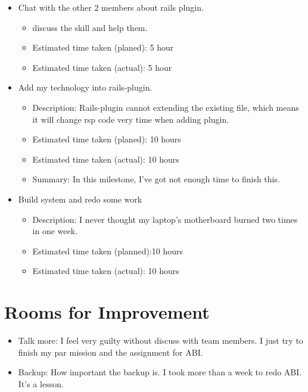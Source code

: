 \documentclass{article}
\begin{document}
\begin{itemize}
\begin{itemize}
\begin{itemize}
                \end{itemize}
        \end{itemize}
    \item Chat with the other 2 members about rails plugin.
        \begin{itemize}
            \item discuss the skill and help them. 
            \item Estimated time taken (planed): 5 hour
            \item Estimated time taken (actual): 5 hour
        \end{itemize}
    \item Add my technology into rails-plugin.
        \begin{itemize}
            \item Description: Rails-plugin cannot extending the existing file, which means it will change rsp code very time when adding plugin.
            \item Estimated time taken (planed): 10 hours
            \item Estimated time taken (actual): 10 hours
            \item Summary: In this milestone, I've got not enough time to finish this.
        \end{itemize}
    \item Build system and redo some work
        \begin{itemize}
            \item Description: I never thought my laptop's motherboard burned two times in one week.
            \item Estimated time taken (planned):10 hours
            \item Estimated time taken (actual): 10 hours
        \end{itemize}
\end{itemize}

\section*{Rooms for Improvement}
\begin{itemize}
    \item Talk more: I feel very guilty without discuss with team members. I just try to finish my par mission and the assignment for ABI.
    \item Backup: How important the backup is. I took more than a week to redo ABI. It's a lesson.
\end{itemize}
\end{document}
